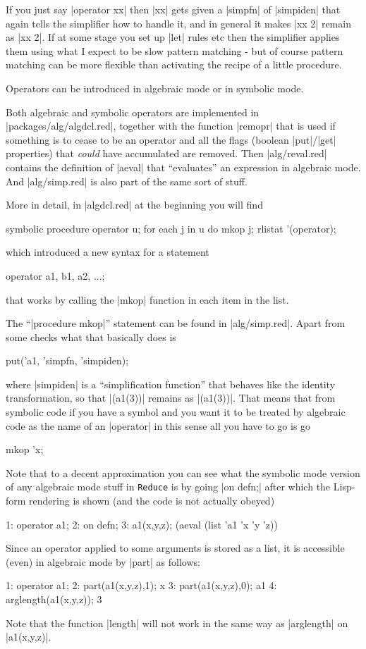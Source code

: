 \documentclass[12pt,twoside,openright]{memoir}
\newcommand{\reduce}{\texttt{Reduce}\xspace}
\begin{document}
If you just say |operator xx| then |xx| gets given a |simpfn| of |simpiden| that
again tells the simplifier how to handle it, and in general it makes |xx 2|
remain as |xx 2|. If at some stage you set up |let| rules etc then the
simplifier applies them using what I expect to be slow pattern matching - but
of course pattern matching can be more flexible than activating the recipe of a
little procedure.

Operators can be introduced in algebraic mode or in symbolic mode.

Both algebraic and symbolic operators are implemented in
|packages/alg/algdcl.red|, together with the function |remopr| that is used if
something is to cease to be an operator and all the flags (boolean |put|/|get|
properties) that {\em could} have accumulated are removed.  Then
|alg/reval.red| contains the definition of |aeval| that ``evaluates''
an expression in algebraic mode. And |alg/simp.red| is also part of the
same sort of stuff.

More in detail, in |algdcl.red| at the beginning you will find
\begin{rlispverb}
  symbolic procedure operator u; for each j in u do mkop j;
  rlistat '(operator);
\end{rlispverb}
which introduced a new syntax for a statement
\begin{rlispverb}
  operator a1, b1, a2, ...;
\end{rlispverb}
that works by calling the |mkop| function in each item in the list.

The ``|procedure mkop|'' statement can be found in |alg/simp.red|. Apart from
some checks what that basically does is
\begin{rlispverb}
  put('a1, 'simpfn, 'simpiden);
\end{rlispverb}
where |simpiden| is a ``simplification function'' that behaves like the
identity transformation, so that |(a1(3))| remains as |(a1(3))|. That means that
from symbolic code if you have a symbol and you want it to be treated by
algebraic code as the name of an |operator| in this sense all you have to go is
go
\begin{rlispverb}
  mkop 'x;
\end{rlispverb}

Note that to a decent approximation you can see what the symbolic mode version
of any algebraic mode stuff in \reduce is by going |on defn;| after which the
Lisp-form rendering is shown (and the code is not actually obeyed)
\begin{rlispverb}
1: operator a1;
2: on defn;
3: a1(x,y,z);
    (aeval (list 'a1 'x 'y 'z))
\end{rlispverb}
Since an operator applied to some arguments is stored as a list, it is
accessible (even) in algebraic mode by |part| as follows:
\begin{rlispverb}
1: operator a1;
2: part(a1(x,y,z),1);
    x
3: part(a1(x,y,z),0);
    a1
4: arglength(a1(x,y,z));
    3
\end{rlispverb}
Note that the function |length| will not work in the same way as |arglength|
on |a1(x,y,z)|.
\end{document}
